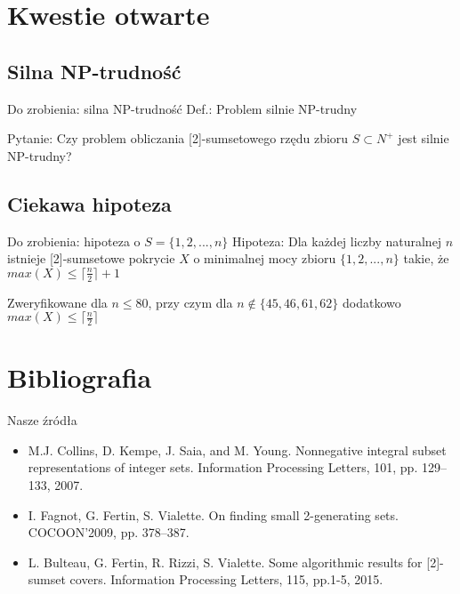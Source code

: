 \documentclass{beamer}
\begin{document}
\section{Kwestie otwarte}
	\subsection{Silna NP-trudność}
		\begin{frame}{Do zrobienia: silna NP-trudność}
			Def.: Problem silnie NP-trudny
			
			Pytanie: Czy problem obliczania [2]-sumsetowego rzędu zbioru $ S \subset N^{+} $ jest silnie NP-trudny?
		\end{frame}
		
	\subsection{Ciekawa hipoteza}
		\begin{frame}{Do zrobienia: hipoteza o $ S = \lbrace 1,2,...,n \rbrace $}
			Hipoteza: Dla każdej liczby naturalnej $ n $ istnieje [2]-sumsetowe pokrycie $ X $ o minimalnej mocy zbioru $ \lbrace 1,2,...,n \rbrace $ takie, że $ max(X) \leq \lceil \frac{n}{2} \rceil + 1 $
			
			Zweryfikowane dla $ n \leq 80 $, przy czym dla $ n \notin \lbrace 45,46,61,62 \rbrace $ dodatkowo $ max(X) \leq \lceil \frac{n}{2} \rceil $
		\end{frame}

\section{Bibliografia}
	\begin{frame}{Nasze źródła}
		\begin{itemize}
			\item M.J. Collins, D. Kempe, J. Saia, and M. Young. Nonnegative integral
subset representations of integer sets. Information Processing Letters, 101, pp. 129–133, 2007.
			\item I. Fagnot, G. Fertin, S. Vialette. On finding small 2-generating sets. COCOON'2009, pp. 378–387.
			\item L. Bulteau, G. Fertin, R. Rizzi, S. Vialette. Some algorithmic results
for [2]-sumset covers. Information Processing Letters, 115, pp.1-5, 2015.
		\end{itemize}
	\end{frame}
	
\end{document}
